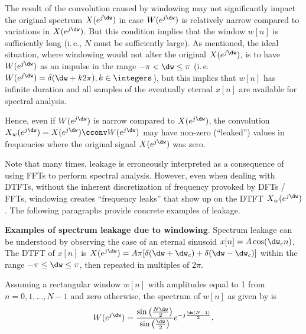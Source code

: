 
The result of the convolution caused by windowing may not significantly impact the original spectrum $X(e^{j \dw})$ in case $W(e^{j \dw})$ is relatively narrow compared to variations in $X(e^{j \dw})$. But this condition implies that the window $w[n]$ is sufficiently long (i.\,e., $N$ must be sufficiently large).
As mentioned, the ideal situation, where windowing would not alter the original $X(e^{j \dw})$, is to have
$W(e^{j \dw})$ as an impulse in the range $-\pi < \dw \le \pi$ (i.\,e.
 $W(e^{j \dw})=\delta(\dw + k 2\pi), k \in \integers$), but this implies that $w[n]$ has infinite duration and all samples of the eventually eternal $x[n]$ are available for spectral analysis.

Hence, even if $W(e^{j \dw})$ is narrow compared to $X(e^{j \dw})$, the convolution $X_w(e^{j \dw}) = X(e^{j \dw}) \cconv W(e^{j \dw})$ may have non-zero (``leaked'') values in frequencies where the original signal $X(e^{j \dw})$ was zero.

Note that many times, leakage is erroneously interpreted as a consequence of using FFTs to perform spectral analysis. However, even when dealing with DTFTs, without the inherent discretization of frequency provoked by DFTs / FFTs, 
windowing creates ``frequency leaks'' that show up on the DTFT $X_w(e^{j \dw})$. 
The following paragraphs provide concrete examples of leakage.

\bExample \textbf{Examples of spectrum leakage due to windowing}.
\label{ex:leakage_example}
Spectrum leakage can be understood by observing the case of an eternal sinusoid $x[n]=A \cos(\dw_c n)$. The DTFT of $x[n]$
is $X(e^{j \dw}) = A \pi [\delta(\dw + \dw_c) + \delta(\dw - \dw_c)]$ within the range $-\pi \le \dw \le \pi$, then repeated in multiples of $2\pi$.

Assuming a rectangular window $w[n]$ with amplitudes equal to 1 from $n=0,1,\ldots,N-1$ and zero otherwise, the spectrum of $w[n]$ as given
by  is
	\begin{equation}
	W(e^{j \dw}) = \frac{\sin \left( \frac{N\dw}{2} \right) }{\sin \left( \frac{\dw}{2}\right) } e^{-j\frac{\dw(N-1)}{2}}.
	\label{eq:dtftRectangularWindow}
	\end{equation}


